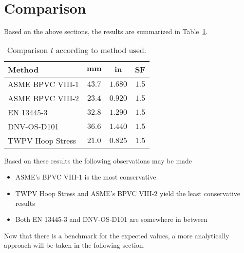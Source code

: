 \section{Comparison}

Based on the above sections, the results are summarized in Table~\ref{table:2_comp}.
\begin{table}[H]
	\centering
	\caption{Comparison $t$ according to method used.}
	\begin{tabular}{lccc}
		\textbf{Method}  & \textbf{$\mathbf{mm}$} & \textbf{$\mathbf{in}$} & \textbf{SF} \\
		\midrule
		ASME BPVC VIII-1 & $43.7$                 & $1.680$                & $1.5$       \\
		ASME BPVC VIII-2 & $23.4$                 & $0.920$                & $1.5$       \\
		EN 13445-3       & $32.8$                 & $1.290$                & $1.5$       \\    
		DNV-OS-D101      & $36.6$                 & $1.440$                & $1.5$       \\
		TWPV Hoop Stress & $21.0$                 & $0.825$                & $1.5$       \\
	\end{tabular}%
	\label{table:2_comp}%
\end{table}%

Based on these results the following observations may be made

\begin{itemize}
	\item ASME's BPVC VIII-1 is the most conservative
	\item TWPV Hoop Stress and ASME's BPVC VIII-2 yield the least conservative results
	\item Both EN 13445-3  and DNV-OS-D101 are somewhere in between \\
\end{itemize}

Now that there is a benchmark for the expected values, a more analytically approach will be taken in the following section.